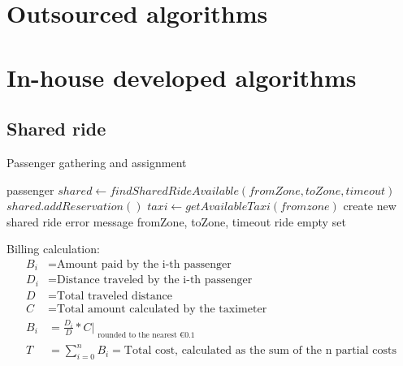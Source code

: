 \section{Outsourced algorithms}

\section{In-house developed algorithms}
\subsection{Shared ride}
Passenger gathering and assignment
\begin{algorithmic}
  {passenger}
  \State $ shared \gets findSharedRideAvailable(fromZone, toZone, timeout) $
    \State $ shared.addReservation() $
  \Else
    \State $ taxi \gets getAvailableTaxi(fromzone) $
      \State create new shared ride
    \Else
      \State error message
    \EndIf
  \EndIf
 \EndFunction
  {fromZone, toZone, timeout}
	    \Return ride
	  \EndIf
	\EndIf
      \EndIf
    \EndIf
  \EndFor
  \Return empty set
 \EndFunction
\end{algorithmic}

Billing calculation:
\begin{align*}
 B_{i} &= \text{Amount paid by the i-th passenger} \\
 D_{i} &= \text{Distance traveled by the i-th passenger} \\
 D &= \text{Total traveled distance} \\
 C &= \text{Total amount calculated by the taximeter} \\
 B_{i} &= \frac{D_{i}}{D} * C |_{\substack{\text{rounded to the nearest €0.1 }}} \\
 T &= \sum_{i=0}^{n} B_{i} = \text{Total cost, calculated as the sum of the n partial costs}
\end{align*}




